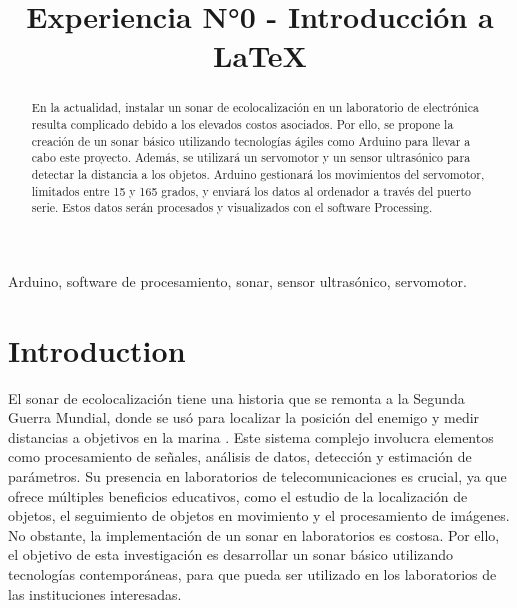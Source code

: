 \documentclass[conference]{IEEEtran}
\begin{document}
\title{Experiencia N°0 - Introducción a \LaTeX}
\author{
}

\maketitle

\begin{abstract}
En la actualidad, instalar un sonar de ecolocalización en un laboratorio de electrónica resulta complicado debido a los elevados costos asociados. Por ello, se propone la creación de un sonar básico utilizando tecnologías ágiles como Arduino para llevar a cabo este proyecto. Además, se utilizará un servomotor y un sensor ultrasónico para detectar la distancia a los objetos. Arduino gestionará los movimientos del servomotor, limitados entre 15 y 165 grados, y enviará los datos al ordenador a través del puerto serie. Estos datos serán procesados y visualizados con el software Processing.
\end{abstract}

\begin{IEEEkeywords}
Arduino, software de procesamiento, sonar, sensor ultrasónico, servomotor.
\end{IEEEkeywords}

\section{Introduction}
El sonar de ecolocalización tiene una historia que se remonta a la Segunda Guerra Mundial, donde se usó para localizar la posición del enemigo y medir distancias a objetivos en la marina \cite{ecolocalizacion}. Este sistema complejo involucra elementos como procesamiento de señales, análisis de datos, detección y estimación de parámetros. Su presencia en laboratorios de telecomunicaciones es crucial, ya que ofrece múltiples beneficios educativos, como el estudio de la localización de objetos, el seguimiento de objetos en movimiento y el procesamiento de imágenes. No obstante, la implementación de un sonar en laboratorios es costosa. Por ello, el objetivo de esta investigación es desarrollar un sonar básico utilizando tecnologías contemporáneas, para que pueda ser utilizado en los laboratorios de las instituciones interesadas. 
\end{document}
